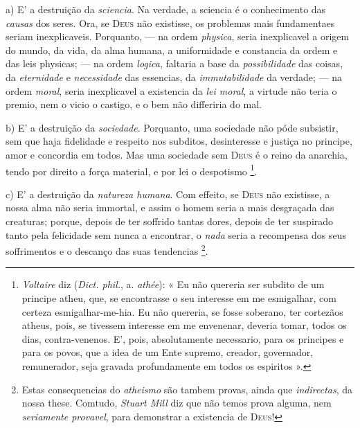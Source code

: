  a) E' a destruição da \emph{sciencia}. Na verdade, a sciencia é o conhecimento das \emph{causas} dos seres. Ora, se \textsc{Deus} não existisse, os problemas mais fundamentaes seriam inexplicaveis. Porquanto, --- na ordem \emph{physica}, seria inexplicavel a origem do mundo, da vida, da alma humana, a uniformidade e constancia da ordem e das leis physicas; --- na ordem \emph{logica}, faltaria a base da \emph{possibilidade} das coisas, da \emph{eternidade} e \emph{necessidade} das essencias, da \emph{immutabilidade} da verdade; --- na ordem \emph{moral}, seria inexplicavel a existencia da \emph{lei moral}, a virtude não teria o premio, nem o vicio o castigo, e o bem não differiria do mal.

b) E' a destruição da \emph{sociedade}. Porquanto, uma sociedade não póde subsistir, sem que haja fidelidade e respeito nos subditos, desinteresse e justiça no principe, amor e concordia em todos. Mas uma sociedade sem \textsc{Deus} é o reino da anarchia, tendo por direito a força material, e por lei o despotismo \footnote{\emph{Voltaire} diz (\emph{Dict. phil.}, a. \emph{athée}): « Eu não quereria ser subdito de um principe atheu, que, se encontrasse o seu interesse em me esmigalhar, com certeza esmigalhar-me-hia. Eu não quereria, se fosse soberano, ter cortezãos atheus, pois, se tivessem interesse em me envenenar, deveria tomar, todos os dias, contra-venenos. E', pois, absolutamente necessario, para os principes e para os povos, que a idea de um Ente supremo, creador, governador, remunerador, seja gravada profundamente em todos os espiritos ».}.

c) E' a destruição da \emph{natureza humana}. Com effeito, se \textsc{Deus} não existisse, a nossa alma não seria immortal, e assim o homem seria a mais desgraçada das creaturas; porque, depois de ter soffrido tantas dores, depois de ter suspirado tanto pela felicidade sem nunca a encontrar, o \emph{nada} seria a recompensa dos seus soffrimentos e o descanço das suas tendencias \footnote{Estas consequencias do \emph{atheismo} são tambem provas, ainda que \emph{indirectas}, da nossa these. Comtudo, \emph{Stuart Mill} diz que não temos prova alguma, nem \emph{seriamente provavel}, para demonstrar a existencia de \textsc{Deus}!}.
